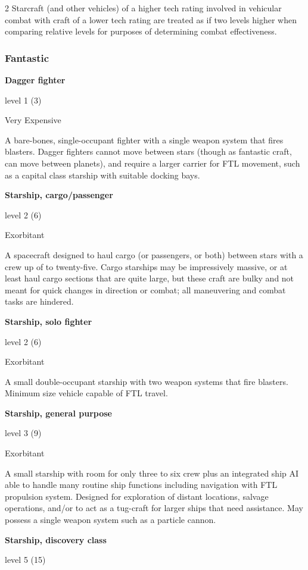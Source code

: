 \begin{multicols}{2}
Starcraft (and other vehicles) of a higher tech rating involved in vehicular combat with craft of a lower tech rating are treated as if two levels higher when comparing relative levels for purposes of determining combat effectiveness.

\subsubsection{Fantastic}

\textbf{Dagger fighter} 

level 1 (3) 

Very Expensive 

A bare-bones, single-occupant fighter with a single weapon system that fires blasters. Dagger fighters cannot move between stars (though as fantastic craft, can move between planets), and require a larger carrier for FTL movement, such as a capital class starship with suitable docking bays. 

\textbf{Starship, cargo/passenger} 

level 2 (6) 

Exorbitant 

A spacecraft designed to haul cargo (or passengers, or both) between stars with a crew up of to twenty-five. Cargo starships may be impressively massive, or at least haul cargo sections that are quite large, but these craft are bulky and not meant for quick changes in direction or combat; all maneuvering and combat tasks are hindered. 

\textbf{Starship, solo fighter} 

level 2 (6)

Exorbitant 

A small double-occupant starship with two weapon systems that fire blasters. Minimum size vehicle capable of FTL travel. 

\textbf{Starship, general purpose} 

level 3 (9) 

Exorbitant 

A small starship with room for only three to six crew plus an integrated ship AI able to handle many routine ship functions including navigation with FTL propulsion system. Designed for exploration of distant locations, salvage operations, and/or to act as a tug-craft for larger ships that need assistance. May possess a single weapon system such as a particle cannon. 

\textbf{Starship, discovery class}

level 5 (15) 


\end{multicols}
